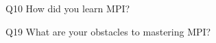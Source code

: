 \begin{description}%
\item{Q10} How did you learn MPI?%
\item{Q19} What are your obstacles to mastering MPI?%
\end{description}%
